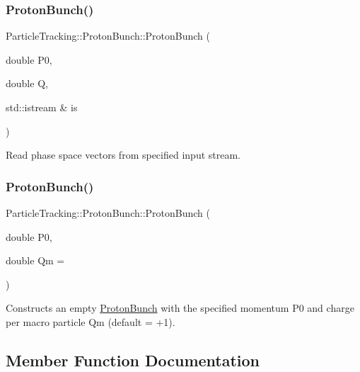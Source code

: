 \subsubsection{\texorpdfstring{Proton\+Bunch()}{ProtonBunch()}\hspace{0.1cm}{\footnotesize\ttfamily [2/3]}}
{\footnotesize\ttfamily Particle\+Tracking\+::\+Proton\+Bunch\+::\+Proton\+Bunch (\begin{DoxyParamCaption}\item[{double}]{P0,  }\item[{double}]{Q,  }\item[{std\+::istream \&}]{is }\end{DoxyParamCaption})\hspace{0.3cm}{\ttfamily [inline]}}

Read phase space vectors from specified input stream. \mbox{\label{classParticleTracking_1_1ProtonBunch_ab69b76eea9a4dc9416b9932a7f34903d}} 
\subsubsection{\texorpdfstring{Proton\+Bunch()}{ProtonBunch()}\hspace{0.1cm}{\footnotesize\ttfamily [3/3]}}
{\footnotesize\ttfamily Particle\+Tracking\+::\+Proton\+Bunch\+::\+Proton\+Bunch (\begin{DoxyParamCaption}\item[{double}]{P0,  }\item[{double}]{Qm = {} }\end{DoxyParamCaption})\hspace{0.3cm}{\ttfamily [inline]}}

Constructs an empty \hyperlink{classParticleTracking_1_1ProtonBunch}{Proton\+Bunch} with the specified momentum P0 and charge per macro particle Qm (default = +1). 

\subsection{Member Function Documentation}
\mbox{\label{classParticleTracking_1_1ProtonBunch_a1a078ed15d187c5208e6d50ec5a763ed}} 
